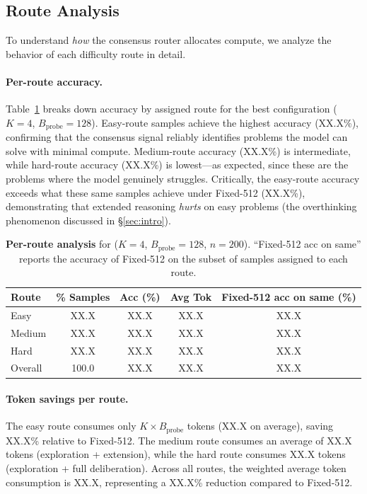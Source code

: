 \subsection{Route Analysis}
\label{sec:exp:routes}

To understand \emph{how} the consensus router allocates compute, we
analyze the behavior of each difficulty route in detail.

\paragraph{Per-route accuracy.}
Table~\ref{tab:route-accuracy} breaks down accuracy by assigned route
for the best \method{} configuration ($K = 4$, $B_{\mathrm{probe}} = 128$).
Easy-route samples achieve the highest accuracy (XX.X\%), confirming
that the consensus signal reliably identifies problems the model can
solve with minimal compute.
Medium-route accuracy (XX.X\%) is intermediate, while hard-route accuracy
(XX.X\%) is lowest---as expected, since these are the problems where the
model genuinely struggles.
Critically, the easy-route accuracy exceeds what these same samples
achieve under Fixed-512 (XX.X\%), demonstrating that extended reasoning
\emph{hurts} on easy problems (the overthinking phenomenon discussed
in \S\ref{sec:intro}).

\begin{table}[t]
\centering
\caption{%
  \textbf{Per-route analysis} for \method{} ($K = 4$,
  $B_{\mathrm{probe}} = 128$, $n = 200$).
  ``Fixed-512 acc on same'' reports the accuracy of Fixed-512 on the
  subset of samples assigned to each route.
}
\label{tab:route-accuracy}
\small
\begin{tabular}{@{}lcccc@{}}
\toprule
\textbf{Route} & \textbf{\% Samples} & \textbf{Acc (\%)} &
  \textbf{Avg Tok} & \textbf{Fixed-512 acc on same (\%)} \\
\midrule
Easy   & XX.X & XX.X & XX.X & XX.X \\
Medium & XX.X & XX.X & XX.X & XX.X \\
Hard   & XX.X & XX.X & XX.X & XX.X \\
\midrule
Overall & 100.0 & XX.X & XX.X & XX.X \\
\bottomrule
\end{tabular}
\end{table}

\paragraph{Token savings per route.}
The easy route consumes only $K \times B_{\mathrm{probe}}$ tokens
(XX.X on average), saving XX.X\% relative to Fixed-512.
The medium route consumes an average of XX.X tokens (exploration +
extension), while the hard route consumes XX.X tokens (exploration +
full deliberation).
Across all routes, the weighted average token consumption is XX.X,
representing a XX.X\% reduction compared to Fixed-512.

